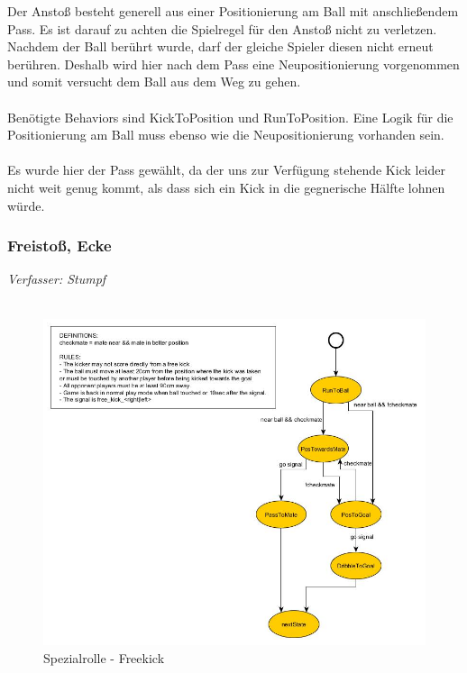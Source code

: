 \documentclass[fontsize=12pt,a4paper,final]{scrartcl}[2003/01/01]
\begin{document}
Der Ansto{\ss} besteht generell aus einer Positionierung am Ball mit anschließendem Pass. Es ist darauf zu achten die Spielregel für den Ansto{\ss} nicht zu verletzen. Nachdem der Ball berührt wurde, darf der gleiche Spieler diesen nicht erneut berühren. Deshalb wird hier nach dem Pass eine Neupositionierung vorgenommen und somit versucht dem Ball aus dem Weg zu gehen.\\
\\
Benötigte Behaviors sind KickToPosition und RunToPosition. Eine Logik für die Positionierung am Ball muss ebenso wie die Neupositionierung vorhanden sein.\\
\\
Es wurde hier der Pass gewählt, da der uns zur Verfügung stehende Kick leider nicht weit genug kommt, als dass sich ein Kick in die gegnerische Hälfte lohnen würde.

\subsubsection{Freisto{\ss}, Ecke}
\textit{Verfasser: Stumpf}\\
\\
\begin{figure}[H]
	\centering
	\includegraphics[width=\textwidth]{Grafiken/KI/Standardsituationen/FreeKickSM}
	\caption{Spezialrolle - Freekick}
	\label{fig:Standard - Freekick, Cornerkick}
\end{figure}
\end{document}
